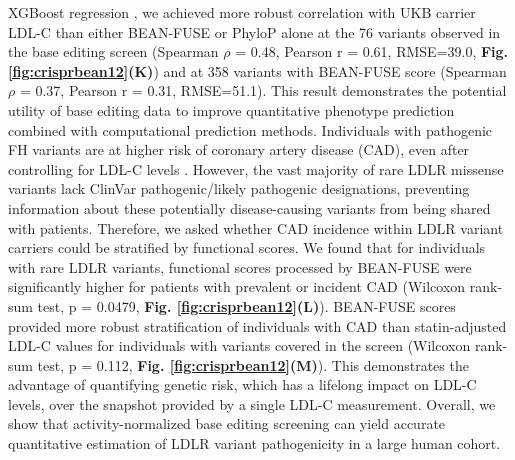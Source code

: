 \documentclass[a4paper, titlepage, openright]{book}
\begin{document}
XGBoost regression \citep{chen2016xgboost}, we achieved more robust correlation with UKB carrier LDL-C than either BEAN-FUSE or PhyloP alone at the 76 variants observed in the base editing screen (Spearman $\rho$ = 0.48, Pearson r = 0.61, RMSE=39.0, \textbf{Fig. \ref{fig:crisprbean12}(K)}) and at 358 variants with BEAN-FUSE score (Spearman $\rho$ = 0.37, Pearson r = 0.31, RMSE=51.1). This result demonstrates the potential utility of base editing data to improve quantitative phenotype prediction combined with computational prediction methods. Individuals with pathogenic FH variants are at higher risk of coronary artery disease (CAD), even after controlling for LDL-C levels \citep{clarke2022coronary}. However, the vast majority of rare LDLR missense variants lack ClinVar pathogenic/likely pathogenic designations, preventing information about these potentially disease-causing variants from being shared with patients. Therefore, we asked whether CAD incidence within LDLR variant carriers could be stratified by functional scores. We found that for individuals with rare LDLR variants, functional scores processed by BEAN-FUSE were significantly higher for patients with prevalent or incident CAD (Wilcoxon rank-sum test, p = 0.0479, \textbf{Fig. \ref{fig:crisprbean12}(L)}). BEAN-FUSE scores provided more robust stratification of individuals with CAD than statin-adjusted LDL-C values for individuals with variants covered in the screen (Wilcoxon rank-sum test, p = 0.112, \textbf{Fig. \ref{fig:crisprbean12}(M)}). This demonstrates the advantage of quantifying genetic risk, which has a lifelong impact on LDL-C levels, over the snapshot provided by a single LDL-C measurement. Overall, we show that activity-normalized base editing screening can yield accurate quantitative estimation of LDLR variant pathogenicity in a large human cohort.
\end{document}
